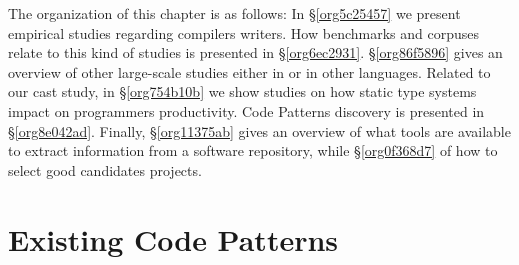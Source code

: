 The organization of this chapter is as follows:
In \S\ref{org5c25457} we present empirical studies regarding compilers writers.
How benchmarks and corpuses relate to this kind of studies is presented in \S\ref{org6ec2931}.
\S\ref{org86f5896} gives an overview of other large-scale studies either in \java{} or in other languages.
Related to our cast study, in \S\ref{org754b10b} we show studies on how static type systems impact on programmers productivity.
Code Patterns discovery is presented in \S\ref{org8e042ad}.
Finally, \S\ref{org11375ab} gives an overview of what tools are available to extract information from a software repository, while \S\ref{org0f368d7} of how to select good candidates projects.

\cite{meyerovich_empirical_2013}

\section{Existing Code Patterns \label{orge5480e0}}
\label{sec:orga63a560}

